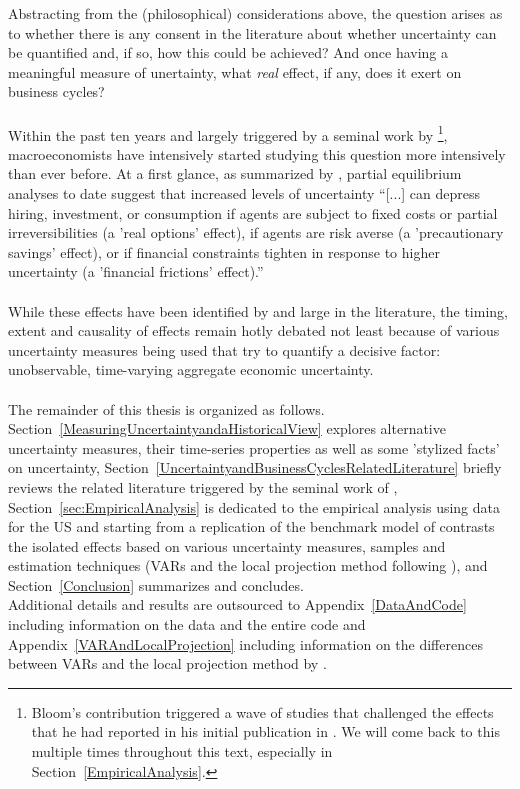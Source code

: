 \documentclass[a4paper,11pt,listof=nochaptergap,oneside,pointednumbers,bibtotoc,bigheadings,liststotoc]{scrbook}
\theoremstyle{mysatz}
\theoremstyle{mydefinition}
\theoremstyle{mybemerkung}
\begin{document}
Abstracting from the (philosophical) considerations above, the question arises as to whether there is any consent in the literature about whether uncertainty can be quantified and, if so, how this could be achieved? And once having a meaningful measure of unertainty, what \textit{real} effect, if any, does it exert on business cycles? \\
\\
Within the past ten years and largely triggered by a seminal work by \citet{bloom:09}\footnote{Bloom's contribution triggered a wave of studies that challenged the effects that he had reported in his initial publication in \citet{bloom:09}. We will come back to this multiple times throughout this text, especially in Section~\ref{EmpiricalAnalysis}.}, macroeconomists have intensively started studying this question more intensively than ever before. At a first glance, as summarized by \citet[p. 1177]{juradoetal:15}, partial equilibrium analyses to date suggest that increased levels of uncertainty ``[...] can depress hiring, investment, or consumption if agents are subject to fixed costs or partial irreversibilities (a 'real options' effect), if agents are risk averse (a 'precautionary savings' effect), or if financial constraints tighten in response to higher uncertainty (a 'financial frictions' effect).'' \\
\\
While these effects have been identified by and large in the literature, the timing, extent and causality of effects remain hotly debated not least because of various uncertainty measures being used that try to quantify a decisive factor: unobservable, time-varying aggregate economic uncertainty.
\\
\\
The remainder of this thesis is organized as follows. Section~\ref{MeasuringUncertaintyandaHistoricalView} explores alternative uncertainty measures, their time-series properties as well as some 'stylized facts' on uncertainty, Section~\ref{UncertaintyandBusinessCyclesRelatedLiterature} briefly reviews the related literature triggered by the seminal work of \citet{bloom:09}, Section~\ref{sec:EmpiricalAnalysis} is dedicated to the empirical analysis using data for the US and starting from a replication of the benchmark model of \citet{bloom:09} contrasts the isolated effects based on various uncertainty measures, samples and estimation techniques (VARs and the local projection method following \citealp{jorda:05}), and Section~\ref{Conclusion} summarizes and concludes. \\
Additional details and results are outsourced to Appendix~\ref{DataAndCode} including information on the data and the entire code and Appendix~\ref{VARAndLocalProjection} including information on the differences between VARs and the local projection method by \citet{jorda:05}.
\end{document}
